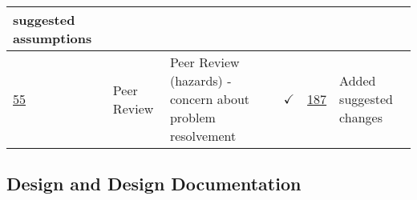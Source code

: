 \documentclass{article}
\begin{document}
\begin{table}[H]
{\begin{tabular}{p{1.5cm} p{2cm} p{3.5cm} c c p{4cm}}
        suggested assumptions \\ \hline
        \href{https://github.com/PlutosCapstone/Plutos/issues/55}{55} & Peer
        Review & Peer Review (hazards) - concern about problem resolvement &
        $\checkmark$ &
        \href{https://github.com/PlutosCapstone/Plutos/pull/187}{187} & Added
        suggested changes \\ 
    \bottomrule
    \end{tabular}%
    }
\end{table}


\subsection{Design and Design Documentation}
\end{document}
